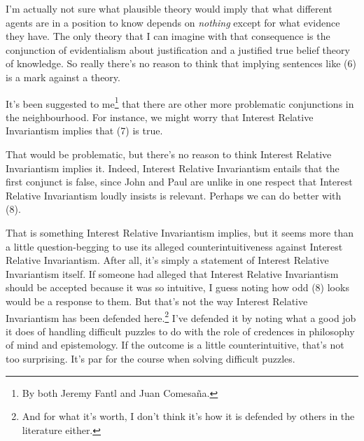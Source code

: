 \noindent I'm actually not sure what plausible theory would imply that what different agents are in a position to know depends on \textit{nothing} except for what evidence they have. The only theory that I can imagine with that consequence is the conjunction of evidentialism about justification and a justified true belief theory of knowledge. So really there's no reason to think that implying sentences like (6) is a mark against a theory.

It's been suggested to me\footnote{By both Jeremy Fantl and Juan Comesa\~{n}a.} that there are other more problematic conjunctions in the neighbourhood. For instance, we might worry that Interest Relative Invariantism implies that (7) is true.


\noindent That would be problematic, but there's no reason to think Interest Relative Invariantism implies it. Indeed, Interest Relative Invariantism entails that the first conjunct is false, since John and Paul are unlike in one respect that Interest Relative Invariantism loudly insists is relevant. Perhaps we can do better with (8).


\noindent That is something Interest Relative Invariantism implies, but it seems more than a little question-begging to use its alleged counterintuitiveness against Interest Relative Invariantism. After all, it's simply a statement of Interest Relative Invariantism itself. If someone had alleged that Interest Relative Invariantism should be accepted because it was so intuitive, I guess noting how odd (8) looks would be a response to them. But that's not the way Interest Relative Invariantism has been defended here.\footnote{And for what it's worth, I don't think it's how it is defended by others in the literature either.} I've defended it by noting what a good job it does of handling difficult puzzles to do with the role of credences in philosophy of mind and epistemology. If the outcome is a little counterintuitive, that's not too surprising. It's par for the course when solving difficult puzzles.

